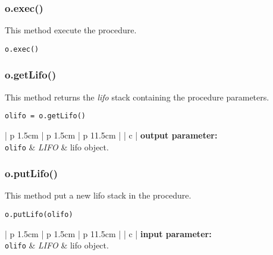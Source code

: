 \vskip 0.4cm

\subsubsection{o.exec()}

This method execute the procedure.

\begin{verbatim}
o.exec()
\end{verbatim}

\vskip 0.4cm

\subsubsection{o.getLifo()}

This method returns the {\sl lifo} stack containing the procedure parameters.

\begin{verbatim}
olifo = o.getLifo()
\end{verbatim}

\noindent
\begin{tabular} {| p {1.5cm} | p {1.5cm} | p {11.5cm} |}
\hline
{} {| c |} {\bf output parameter:} \\
\hline
{\tt olifo} & {\it LIFO}  & {\sc lifo} object. \\
\hline
\end{tabular}

\vskip 0.4cm

\subsubsection{o.putLifo()}

This method put a new {\sc lifo} stack in the procedure.

\begin{verbatim}
o.putLifo(olifo)
\end{verbatim}

\noindent
\begin{tabular} {| p {1.5cm} | p {1.5cm} | p {11.5cm} |}
\hline
{} {| c |} {\bf input parameter:} \\
\hline
{\tt olifo} & {\it LIFO}  & {\sc lifo} object. \\
\hline
\end{tabular}
